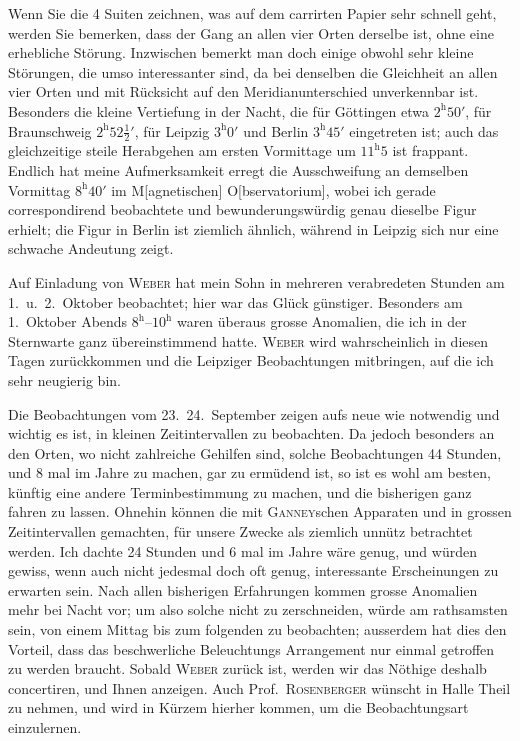\documentclass[12pt,a4paper]{article}
\begin{document}
Wenn Sie die 4 Suiten zeichnen, was auf dem carrirten Papier sehr schnell geht, werden Sie bemerken, dass der Gang an allen vier Orten derselbe ist, ohne eine erhebliche St\"orung. Inzwischen bemerkt man doch einige obwohl sehr kleine St\"orungen, die umso interessanter sind, da bei denselben die Gleichheit an allen vier Orten und mit R\"ucksicht auf den Meridianunterschied unverkennbar ist. Besonders die kleine Vertiefung in der Nacht, die f\"ur G\"ottingen etwa $2^{\mathrm{h}} 50'$, f\"ur Braunschweig $2^{\mathrm{h}} 52\frac12'$, f\"ur Leipzig $3^{\mathrm{h}} 0'$ und Berlin $3^{\mathrm{h}} 45'$ eingetreten ist; auch das gleichzeitige steile Herabgehen am ersten Vormittage um $11^{\mathrm{h}} 5$ ist frappant. Endlich hat meine Aufmerksamkeit erregt die Ausschweifung an demselben Vormittag $8^{\mathrm{h}} 40'$ im M[agnetischen] O[bservatorium], wobei ich gerade correspondirend beobachtete und bewunderungsw\"urdig genau dieselbe Figur erhielt; die Figur in Berlin ist ziemlich \"ahnlich, w\"ahrend in Leipzig sich nur eine schwache Andeutung zeigt.

Auf Einladung von \textsc{Weber} hat mein Sohn in mehreren verabredeten Stunden am 1.~u.~2.~Oktober beobachtet; hier war das Gl\"uck g\"unstiger. Besonders am 1.~Oktober Abends $8^{\mathrm{h}}$--$10^{\mathrm{h}}$ waren \"uberaus grosse Anomalien, die ich in der Sternwarte ganz \"ubereinstimmend hatte. \textsc{Weber} wird wahrscheinlich in diesen Tagen zur\"uckkommen und die Leipziger Beobachtungen mitbringen, auf die ich sehr neugierig bin.

Die Beobachtungen vom 23.~24.~September zeigen aufs neue wie notwendig und wichtig es ist, in kleinen Zeitintervallen zu beobachten. Da jedoch besonders an den Orten, wo nicht zahlreiche Gehilfen sind, solche Beobachtungen 44 Stunden, und 8 mal im Jahre zu machen, gar zu erm\"udend ist, so ist es wohl am besten, k\"unftig eine andere Terminbestimmung zu machen, und die bisherigen ganz fahren zu lassen. Ohnehin k\"onnen die mit \textsc{Ganney}schen Apparaten und in grossen Zeitintervallen gemachten, f\"ur unsere Zwecke als ziemlich unn\"utz betrachtet werden. Ich dachte 24 Stunden und 6 mal im Jahre w\"are genug, und w\"urden gewiss, wenn auch nicht jedesmal doch oft genug, interessante Erscheinungen zu erwarten sein. Nach allen bisherigen Erfahrungen kommen grosse Anomalien mehr bei Nacht vor; um also solche nicht zu zerschneiden, w\"urde am rathsamsten sein, von einem Mittag bis zum folgenden zu beobachten; ausserdem hat dies den Vorteil, dass das beschwerliche Beleuchtungs Arrangement nur einmal getroffen zu werden braucht. Sobald \textsc{Weber} zur\"uck ist, werden wir das N\"othige deshalb concertiren, und Ihnen anzeigen. Auch Prof.~\textsc{Rosenberger} w\"unscht in Halle Theil zu nehmen, und wird in K\"urzem hierher kommen, um die Beobachtungsart einzulernen.
\end{document}
